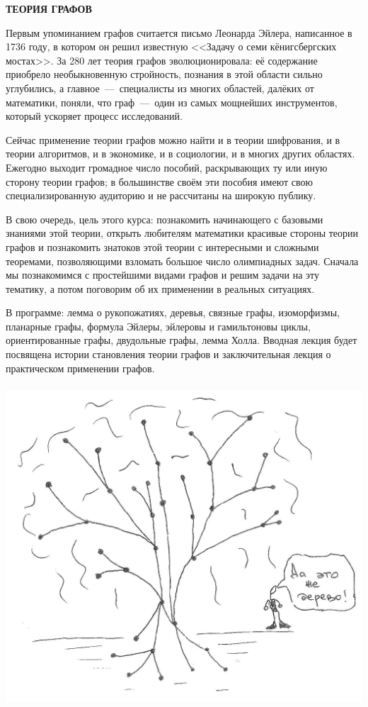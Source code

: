 \documentclass[12pt,a4paper]{article}
\begin{document}
\begin{center}
\textbf{ТЕОРИЯ ГРАФОВ}
\end{center}

	Первым упоминанием графов считается письмо Леонарда Эйлера, написанное в 1736 году, в котором он решил известную <<Задачу о семи кёнигсбергских мостах>>. За 280 лет теория графов эволюционировала: её содержание приобрело необыкновенную стройность, познания в этой области сильно углубились, а главное~---~специалисты из многих областей, далёких от математики, поняли, что граф~---~один из самых мощнейших инструментов, который ускоряет процесс исследований.
	
	Сейчас применение теории графов можно найти и в теории шифрования, и в теории алгоритмов, и в экономике, и в социологии, и в многих других областях. Ежегодно выходит громадное число пособий, раскрывающих ту или иную сторону теории графов; в большинстве своём эти пособия имеют свою специализированную аудиторию и не рассчитаны на широкую публику.
	
	В свою очередь, цель этого курса: познакомить начинающего с базовыми знаниями этой теории, открыть любителям математики красивые стороны теории графов и познакомить знатоков этой теории с интересными и сложными теоремами, позволяющими взломать большое число олимпиадных задач. Сначала мы познакомимся с простейшими видами графов и решим задачи на эту тематику, а потом поговорим об их применении в реальных ситуациях.
	
	В программе: лемма о рукопожатиях, деревья, связные графы, изоморфизмы, планарные графы, формула Эйлеры, эйлеровы и гамильтоновы циклы, ориентированные графы, двудольные графы, лемма Холла. Вводная лекция будет посвящена истории становления теории графов и заключительная лекция о практическом применении графов.
	
\begin{center}
\includegraphics[width=20cm, height=12cm,keepaspectratio]{tree}
\end{center}
\end{document}
